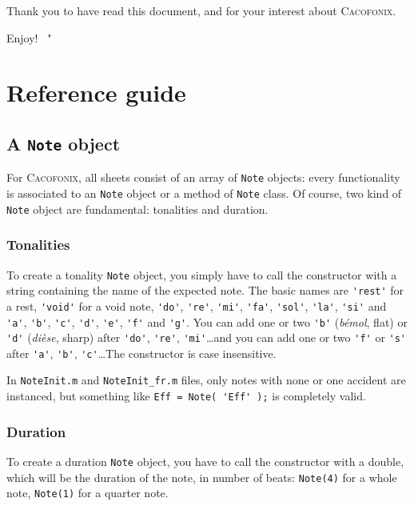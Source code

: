 \documentclass{article}
\newcommand\cacofonix{\textsc{Cacofonix}\xspace}
\newcommand\note{\lstinline!Note!\xspace}
\newcommand\noteInitFile{\texttt{NoteInit.m}\xspace}
\newcommand\noteInitFrFile{\texttt{NoteInit\_fr.m}\xspace}
\newenvironment{myselfenv}{ \par \noindent \makebox[6em][r]{ \textcolor{myselfcolor}{Myself}: " --~}}{~"}
\newcommand{ \myself }[1]{%
\begin{myselfenv}%
	#1%
\end{myselfenv} }
\begin{document}
Thank you to have read this document, and for your interest about \cacofonix.

\myself{ Enjoy! }

\section{Reference guide}

\subsection{A \note object}

For \cacofonix, all sheets consist of an array of \lstinline!Note! objects: every functionality is associated to an \lstinline!Note! object or a method of \lstinline!Note! class. Of course, two kind of \lstinline!Note! object are fundamental: tonalities and duration.

\subsubsection{Tonalities}
\label{sec:Tonalities}

To create a tonality \lstinline!Note! object, you simply have to call the constructor with a string containing the name of the expected note. The basic names are \lstinline!'rest'! for a rest, \lstinline!'void'! for a void note, \lstinline!'do'!, \lstinline!'re'!, \lstinline!'mi'!, \lstinline!'fa'!, \lstinline!'sol'!, \lstinline!'la'!, \lstinline!'si'! and \lstinline!'a'!, \lstinline!'b'!, \lstinline!'c'!, \lstinline!'d'!, \lstinline!'e'!, \lstinline!'f'! and \lstinline!'g'!. You can add one or two \lstinline!'b'! (\emph{b\'emol}, flat) or \lstinline!'d'! (\emph{di\`ese}, sharp) after \lstinline!'do'!, \lstinline!'re'!, \lstinline!'mi'!\dots and you can add one or two \lstinline!'f'! or \lstinline!'s'! after \lstinline!'a'!, \lstinline!'b'!, \lstinline!'c'!\dots The constructor is case insensitive.

In \noteInitFile and \noteInitFrFile files, only notes with none or one accident are instanced, but something like \lstinline!Eff = Note( 'Eff' );! is completely valid.

\subsubsection{Duration}

To create a duration \lstinline!Note! object, you have to call the constructor with a double, which will be the duration of the note, in number of beats: \lstinline!Note(4)! for a whole note, \lstinline!Note(1)! for a quarter note.
\end{document}
